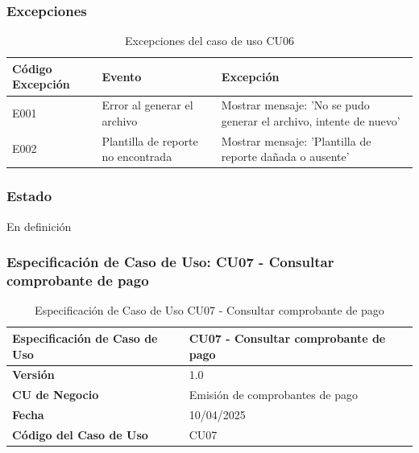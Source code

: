 \newpage

\subsubsection*{Excepciones}
\begin{table}[h]
	\centering
	\caption{Excepciones del caso de uso CU06}
	\begin{tabular}{|p{3cm}|p{5cm}|p{5cm}|}
		\hline
		\textbf{Código Excepción} & \textbf{Evento}                    & \textbf{Excepción}                                                 \\ \hline
		E001                      & Error al generar el archivo        & Mostrar mensaje: 'No se pudo generar el archivo, intente de nuevo' \\ \hline
		E002                      & Plantilla de reporte no encontrada & Mostrar mensaje: 'Plantilla de reporte dañada o ausente'           \\ \hline
	\end{tabular}
\end{table}

\subsubsection*{Estado}
En definición


\subsubsection*{Especificación de Caso de Uso: CU07 - Consultar comprobante de pago}

\begin{table}[h]
	\centering
	\caption{Especificación de Caso de Uso CU07 - Consultar comprobante de pago}
	\begin{tabular}{|p{5cm}|p{9cm}|}
		\hline
		\textbf{Especificación de Caso de Uso} & CU07 - Consultar comprobante de pago \\ \hline
		\textbf{Versión}                       & 1.0                                  \\ \hline
		\textbf{CU de Negocio}                 & Emisión de comprobantes de pago      \\ \hline
		\textbf{Fecha}                         & 10/04/2025                           \\ \hline
		\textbf{Código del Caso de Uso}        & CU07                                 \\ \hline
	\end{tabular}
\end{table}


